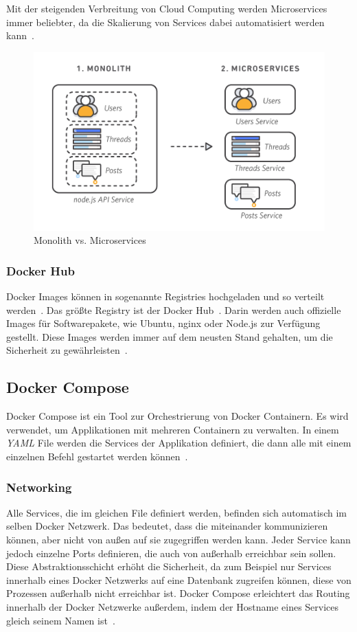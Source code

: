  Mit der steigenden Verbreitung von Cloud Computing werden Microservices immer beliebter, da die Skalierung
 von Services dabei automatisiert werden kann~\cite{microservices}.

 \begin{figure}[hbt!]
     \centering
     \includegraphics[scale=0.5]{pics/microservice.png}
     \caption{Monolith vs. Microservices}
 \end{figure}

 \subsubsection{Docker Hub}
 Docker Images können in sogenannte Registries hochgeladen und so verteilt werden~\cite{docker-registry}.
 Das größte Registry ist der Docker Hub~\cite{docker-hub}.
 Darin werden auch offizielle Images für Softwarepakete, wie Ubuntu, nginx oder Node.js zur Verfügung gestellt.
 Diese Images werden immer auf dem neusten Stand gehalten, um die Sicherheit zu
 gewährleisten~\cite{docker-official-images}.

\subsection{Docker Compose}

 Docker Compose ist ein Tool zur Orchestrierung von Docker Containern.
 Es wird verwendet, um Applikationen mit mehreren Containern zu verwalten.
 In einem \textit{YAML} File werden die Services der Applikation definiert, die dann alle mit einem einzelnen
 Befehl gestartet werden können~\cite{docker-compose}.

 \subsubsection{Networking}
 Alle Services, die im gleichen File definiert werden, befinden sich automatisch im selben Docker Netzwerk.
 Das bedeutet, dass die miteinander kommunizieren können, aber nicht von außen auf sie zugegriffen werden kann.
 Jeder Service kann jedoch einzelne Ports definieren, die auch von außerhalb erreichbar sein sollen.
 Diese Abstraktionsschicht erhöht die Sicherheit, da zum Beispiel nur Services innerhalb eines Docker Netzwerks auf eine
 Datenbank zugreifen können, diese von Prozessen außerhalb nicht erreichbar ist.
 Docker Compose erleichtert das Routing innerhalb der Docker Netzwerke außerdem, indem der Hostname eines Services
 gleich seinem Namen ist~\cite{docker-network}.
